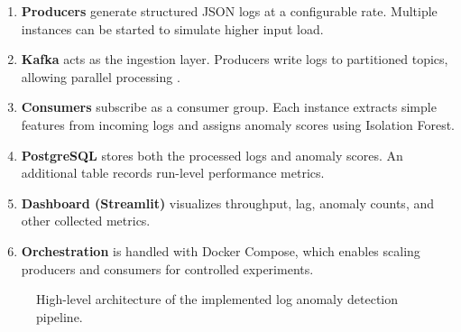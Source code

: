\documentclass[12pt,a4paper]{report}
\begin{document}
\begin{enumerate}
    \item \textbf{Producers} generate structured JSON logs at a configurable rate. Multiple instances can be started to simulate higher input load.
    \item \textbf{Kafka} acts as the ingestion layer. Producers write logs to partitioned topics, allowing parallel processing \cite{Mayer2017}.
    \item \textbf{Consumers} subscribe as a consumer group. Each instance extracts simple features from incoming logs and assigns anomaly scores using Isolation Forest.
    \item \textbf{PostgreSQL} stores both the processed logs and anomaly scores. An additional table records run-level performance metrics.
    \item \textbf{Dashboard (Streamlit)} visualizes throughput, lag, anomaly counts, and other collected metrics.
    \item \textbf{Orchestration} is handled with Docker Compose, which enables scaling producers and consumers for controlled experiments.
\end{enumerate}

\begin{figure}[htbp]
\centering
{}
\caption{High-level architecture of the implemented log anomaly detection pipeline.}
\label{fig:architecture}
\end{figure}
\end{document}
